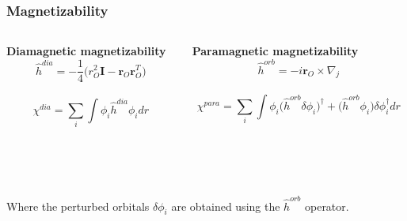 \begin{frame}
    \frametitle{Magnetizability}
    \begin{columns}
    \begin{column}[b]{0.5\textwidth}
	\centering
	\textbf{Diamagnetic magnetizability}
	\begin{equation}
	    \nonumber
	    \hat{h}^{dia} = -\frac{1}{4}\Big(r_O^2\boldsymbol{I} - 
                \boldsymbol{r}_O\boldsymbol{r}_O^T\Big)
	\end{equation}
	\ \\
	\begin{equation}
	    \nonumber
	    \chi^{dia} = \sum_i \int \phi_i \hat{h}^{dia} \phi_i dr
	\end{equation}
    \end{column}
    \begin{column}[b]{0.5\textwidth}
	\centering
	\textbf{Paramagnetic magnetizability}
	\begin{equation}
	    \nonumber
	    \hat{h}^{orb} = -i \boldsymbol{r}_O\times\nabla_j
	\end{equation}
	\ \\
	\begin{equation}
	    \nonumber
	    \chi^{para} = \sum_i \int \phi_i \Big(\hat{h}^{orb} \delta\phi_i\Big)^\dag + 
	    \Big(\hat{h}^{orb}\phi_i\Big)\delta\phi_i^\dag dr
	\end{equation}
    \end{column}
    \end{columns}
    \ \\
    \ \\
    \ \\
    Where the perturbed orbitals $\delta\phi_i$ are obtained using the $\hat{h}^{orb}$ operator.
    \ \\
    \ \\
    \ \\


\end{frame}
